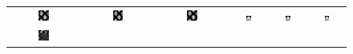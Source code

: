 \documentclass[twocolumn,twoside]{IEEEtran/IEEEtran}
\begin{document}
\begin{figure}[htbp]
\begin{tabular}{cccccc}
    \includegraphics[width=0.16\textwidth]{figures-SBA/anothergrating_gt_framed}
                                   & \includegraphics[width=0.16\textwidth]{figures-SBA/anothergrating_40mu}		
                                                          & \includegraphics[width=0.16\textwidth]{figures-SBA/anothergrating_bptv_40mu}	
                                                                                 & \includegraphics[width=0.16\textwidth]{figures-SBA/anothergrating_gt_zoomin}	
                                                                                                                      & \includegraphics[width=0.16\textwidth]{figures-SBA/anothergrating_40mu_zoomin}
                                                                                                                                                       & \includegraphics[width=0.16\textwidth]{figures-SBA/anothergrating_bptv_40mu_zoomin}	\\
    \includegraphics[width=0.16\textwidth]{figures-SBA/dnaforbptv_gt_framed}

\end{tabular}
\end{figure}
\end{document}
